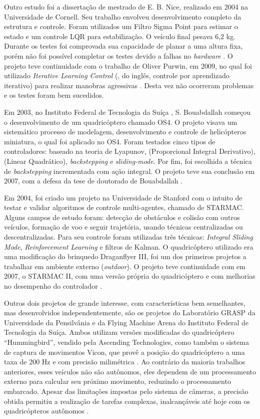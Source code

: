 Outro estudo foi a dissertação de mestrado de E. B. Nice, realizado em 2004 na Universidade de Cornell. Seu trabalho envolveu desenvolvimento completo da estrutura e controle. Foram utilizados um Filtro Sigma Point para estimar o estado e um controle LQR para estabilização. O veículo final pesava 6,2 kg. Durante os testes foi comprovada sua capacidade de planar a uma altura fixa, porém não foi possível completar os testes devido a falhas no \textit{hardware} \cite{niceCU04}. O projeto teve continuidade com o trabalho de Oliver Purwin, em 2009, no qual foi utilizado \textit{Iterative Learning Control} (, do inglês, controle por aprendizado iterativo) para realizar manobras agressivas \cite{purICRA09}. Desta vez não ocorreram problemas e os testes foram bem sucedidos.

Em 2003, no Instituto Federal de Tecnologia da Suíça , S. Bouabdallah começou o desenvolvimento de um quadricóptero chamado OS4. O projeto visava um sistemático processo de modelagem, desenvolvimento e controle de helicópteros miniatura, o qual foi aplicado no OS4. Foram testados cinco tipos de controladores: baseado na teoria de Lyapunov,  (Proporcional Integral Derivativo),  (Linear Quadrático), \textit{backstepping} e \textit{sliding-mode}. Por fim, foi escolhida a técnica de \textit{backstepping} incrementada com ação integral. O projeto teve sua conclusão em 2007, com a defesa da tese de doutorado de Bouabdallah \cite{bouabdallah07}. 

Em 2004, foi criado um projeto na Universidade de Stanford com o intuito de testar e validar algoritmos de controle multi-agentes, chamado de STARMAC. Alguns campos de estudo foram: detecção de obstáculos e colisão com outros veículos, formação de voo e seguir trajetória, usando técnicas centralizadas ou descentralizadas. Para seu controle foram utilizadas três técnicas: \textit{Integral Sliding Mode}, \textit{Reinforcement Learning} e filtros de Kalman. O quadricóptero utilizado era uma modificação do brinquedo Draganflyer III, foi um dos primeiros projetos a trabalhar em ambiente externo (\textit{outdoor}). O projeto teve continuidade com em 2007, o STARMAC II, com uma versão própria do quadricóptero e com melhorias no desempenho do controlador \cite{starmac04, starmac07}.

Outros dois projetos de grande interesse, com características bem semelhantes, mas desenvolvidos independentemente, são os projetos do Laboratório GRASP da Universidade da Pensilvânia e da Flying Machine Arena do Instituto Federal de Tecnologia da Suíça. Ambos utilizam versões modificadas do quadricóptero ``Hummingbird'', vendido pela Ascending Technologies, como também o sistema de captura de movimentos Vicon, que provê a posição do quadricóptero a uma taxa de 200 Hz e com precisão milimétrica \cite{Lupashin2010, michael2010}. Ao contrário da maioria trabalhos anteriores, esses veículos não são autônomos, eles dependem de um processamento externo para calcular seu próximo movimento, reduzindo o processamento embarcado. Apesar das limitações impostas pelo sistema de câmeras, a precisão obtida permitiu a realização de tarefas complexas, inalcançáveis até hoje com os quadricópteros autônomos .

